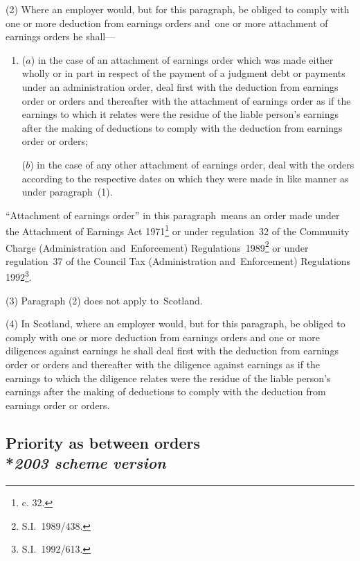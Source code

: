 \documentclass[12pt,a4paper]{article}
\begin{document}
(2) Where an employer would, but for this paragraph, be obliged to comply with one or more deduction from earnings orders and~one or more attachment of earnings orders he shall—
\begin{enumerate}\item[]
($a$) in the case of an attachment of earnings order which was made either wholly or in part in respect of the payment of a judgment debt or payments under an administration order, deal first with the deduction from earnings order or orders and thereafter with the attachment of earnings order as if the earnings to which it relates were the residue of the liable person’s earnings after the making of deductions to comply with the deduction from earnings order or orders;

($b$) in the case of any other attachment of earnings order, deal with the orders according to the respective dates on which they were made in like manner as under paragraph~(1).\end{enumerate}

“Attachment of earnings order” in this paragraph~means an order made under the Attachment of Earnings Act 1971\footnote{ c. 32.} or under regulation~32 of the Community Charge (Administration and~Enforcement) Regulations~1989\footnote{\frenchspacing S.I.~1989/438.}
or under regulation~37 of the Council Tax (Administration and~Enforcement) Regulations 1992\footnote{\frenchspacing  S.I.~1992/613.}. %

(3) Paragraph (2) does not apply to~Scotland.

(4) In Scotland, where an employer would, but for this paragraph, be obliged to comply with one or more deduction from earnings orders and one or more diligences against earnings he shall deal first with the deduction from earnings order or orders and thereafter with the diligence against earnings as if the earnings to which the diligence relates were the residue of the liable person’s earnings after the making of deductions to comply with the deduction from earnings order or orders.


\subsection[24. Priority as between orders --- \emph{2003 scheme version}]{Priority as between orders\\*\emph{2003 scheme version}}
\end{document}

